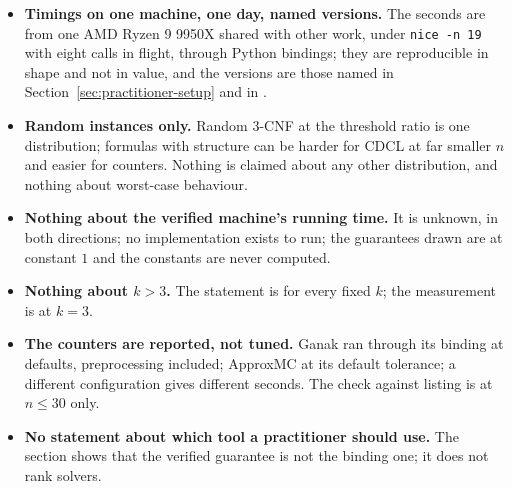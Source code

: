 \begin{itemize}
\item \textbf{Timings on one machine, one day, named versions.} The
  seconds are from one AMD Ryzen 9 9950X shared with other work, under
  \texttt{nice -n 19} with eight calls in flight, through Python
  bindings; they are reproducible in shape and not in value, and the
  versions are those named in Section~\ref{sec:practitioner-setup} and
  in .
\item \textbf{Random instances only.} Random 3-CNF at the threshold
  ratio is one distribution; formulas with structure can be harder for
  CDCL at far smaller $n$ and easier for counters. Nothing is claimed
  about any other distribution, and nothing about worst-case behaviour.
\item \textbf{Nothing about the verified machine's running time.} It is
  unknown, in both directions; no implementation exists to run; the
  guarantees drawn are at constant $1$ and the constants are never
  computed.
\item \textbf{Nothing about $k > 3$.} The statement is for every fixed
  $k$; the measurement is at $k = 3$.
\item \textbf{The counters are reported, not tuned.} Ganak ran through
  its binding at defaults, preprocessing included; ApproxMC at its
  default tolerance; a different configuration gives different seconds.
  The check against listing is at $n \le 30$ only.
\item \textbf{No statement about which tool a practitioner should use.}
  The section shows that the verified guarantee is not the binding one;
  it does not rank solvers.
\end{itemize}
